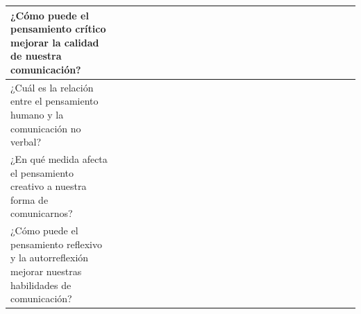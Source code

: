 \documentclass[12pt,a4paper]{article}
\begin{document}
\begin{landscape}
\begin{table}[ht!]
\begin{tabular}{llllllllllllllllllllllllll}
			¿Cómo puede el pensamiento crítico mejorar la calidad de nuestra comunicación?                         &                                          &    &    &    &    &    &    &    &    &     &     &     &     &     &     &     &     &     &     &     &           \\\hline
			¿Cuál es la relación entre el pensamiento humano y la comunicación no verbal?                          &                                          &    &    &    &    &    &    &    &    &     &     &     &     &     &     &     &     &     &     &     &           \\\hline
			¿En qué medida afecta el pensamiento creativo a nuestra forma de comunicarnos?                         &                                          &    &    &    &    &    &    &    &    &     &     &     &     &     &     &     &     &     &     &     &           \\\hline
			¿Cómo puede el pensamiento reflexivo y la autorreflexión mejorar nuestras habilidades de comunicación? &                                          &    &    &    &    &    &    &    &    &     &     &     &     &     &     &     &     &     &     &     &           \\\hline
		\end{tabular}
	\end{table}
\end{landscape}
\end{document}
